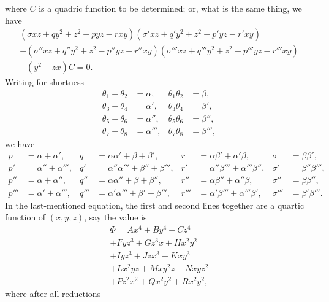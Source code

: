 \documentclass[11pt,a4paper]{book}
\begin{document}
\newpage
\noindent where $C$ is a quadric function to be determined; or, what is the same thing, we have
\begin{multline*}
(\sigma xz + qy^2 + z^2 - pyz - rxy)
(\sigma' xz + q'y^2 + z^2 - p'yz - r'xy) \\
- (\sigma'' xz + q''y^2 + z^2 - p''yz - r''xy)
(\sigma''' xz + q'''y^2 + z^2 - p'''yz - r'''xy) \\
+ (y^2 - zx)C = 0.
\end{multline*}
Writing for shortness
\begin{align*}
\theta_1 + \theta_2 &= \alpha,     & \theta_1\theta_2 &= \beta, \\
\theta_3 + \theta_4 &= \alpha',    & \theta_3\theta_4 &= \beta', \\
\theta_5 + \theta_6 &= \alpha'',   & \theta_5\theta_6 &= \beta'', \\
\theta_7 + \theta_8 &= \alpha''',  & \theta_7\theta_8 &= \beta''',
\end{align*}
we have
\begin{align*}
p  &= \alpha + \alpha', & q  &= \alpha\alpha' + \beta + \beta', & r  &= \alpha\beta' + \alpha'\beta, & \sigma &= \beta\beta', \\
p' &= \alpha'' + \alpha''', & q' &= \alpha''\alpha''' + \beta'' + \beta''', & r' &= \alpha''\beta''' + \alpha'''\beta'', & \sigma' &= \beta''\beta''', \\
p'' &= \alpha + \alpha'', & q'' &= \alpha\alpha'' + \beta + \beta'', & r'' &= \alpha\beta'' + \alpha''\beta, & \sigma'' &= \beta\beta'', \\
p''' &= \alpha' + \alpha''', & q''' &= \alpha'\alpha''' + \beta' + \beta''', & r''' &= \alpha'\beta''' + \alpha'''\beta', & \sigma''' &= \beta'\beta'''.
\end{align*}
In the last-mentioned equation, the first and second lines together are a quartic
function of $(x, y, z)$, say the value is
\begin{multline*}
\Phi = Ax^4 + By^4 + Cz^4 \\
+ Fyz^3 + Gz^3x + Hx^2y^2 \\
+ Iyz^3 + Jzx^3 + Kxy^3 \\
+ Lx^2yz + Mxy^2z + Nxyz^2 \\
+ Pz^2x^2 + Qx^2y^2 + Rx^2y^2,
\end{multline*}
where after all reductions
\end{document}
